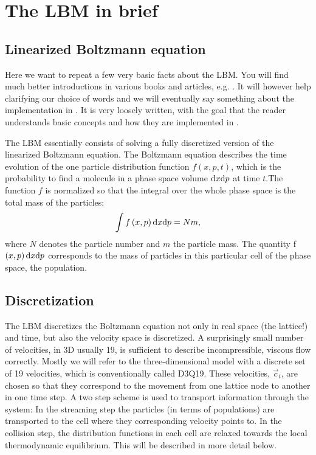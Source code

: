 \section{The LBM in brief}

\subsection*{Linearized Boltzmann equation}

Here we want to repeat a few very basic facts about the LBM. 
You will find much better introductions in various books and
articles, e.g. \cite{succi01a, duenweg09a}. It will however help clarifying 
our choice of words and we will eventually say something about the 
implementation in \ES{}. It is very loosely written, with the goal that
the reader understands basic concepts and how they are implemented in \ES{}.


The LBM essentially consists of solving a fully discretized
version of the linearized Boltzmann equation. The Boltzmann equation
describes the time evolution of the one particle distribution
function $f\left(x,p,t\right)$, which is the probability to find a molecule in a phase
space volume $\mathrm d x \mathrm d p$ at time $t$.The function $f$ is normalized
so that the integral over the whole phase space is the total 
mass of the particles:
\begin{equation*}
  \int f\left(x,p\right)\mathrm d x \mathrm d p = Nm,
\end{equation*}
where $N$ denotes the particle number and $m$ the particle mass.
The quantity f$\left(x,p\right)\mathrm d x \mathrm d p$ corresponds
to the mass of particles in this particular cell of the phase
space, the population. \\

\subsection*{Discretization}
The LBM discretizes the Boltzmann equation not only in real
space (the lattice!) and time, but also the velocity space is discretized.
A surprisingly small number of velocities, in 3D usually 
19, is sufficient to describe incompressible, viscous flow correctly.
Mostly we will refer to the three-dimensional model with a discrete
set of 19 velocities, which is conventionally called D3Q19.
These velocities, $\vec c_i$,
are chosen so that they correspond to the movement from one lattice
node to another in one time step. A two step scheme is used to transport
information through the system: In the streaming step
the particles (in terms of populations) are transported
to the cell where they corresponding velocity points to. 
In the collision step, the distribution functions
in each cell are relaxed towards the local thermodynamic
equilibrium. This will be described in more detail below.

